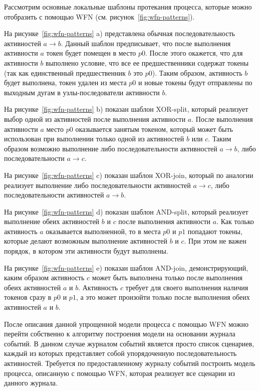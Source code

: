 \documentclass[
11pt,%
tightenlines,%
twoside,%
onecolumn,%
nofloats,%
nobibnotes,%
nofootinbib,%
superscriptaddress,%
noshowpacs,%
centertags]%
{revtex4}
\begin{document}
Рассмотрим основные локальные шаблоны протекания процесса, которые можно отобразить с помощью WFN (см. рисунок~\ref{fig:wfn-patterns}).

На рисунке~\ref{fig:wfn-patterns} a) представлена обычная последовательность активностей $a \rightarrow b$.
Данный шаблон предписывает, что после выполнения активности $a$ токен будет помещен в место $p0$.
После этого окажется, что для активности $b$ выполнено условие, что все ее предшественники содержат токены (так как единственный предшественник $b$ это $p0$).
Таким образом, активность $b$ будет выполнена, токен удален из места $p0$ и новые токены будут отправлены по выходным дугам в узлы-последователи активности $b$.
     
На рисунке~\ref{fig:wfn-patterns} b) показан шаблон XOR-split, который реализует выбор одной из активностей после выполнения активности $a$.
После выполнения активности $a$ место $p0$ оказывается занятым токеном, который может быть использован при выполнении только одной из активностей $b$ или $c$.
Таким образом возможно выполнение либо последовательности активностей $a \rightarrow b$, либо последовательности $a \rightarrow c$.

На рисунке~\ref{fig:wfn-patterns} c) показан шаблон XOR-join, который по аналогии реализует выполнение либо последовательности активностей $a \rightarrow c$, либо последовательности активностей $a \rightarrow b$.

На рисунке~\ref{fig:wfn-patterns} d) показан шаблон AND-split, который реализует выполнение обеих активностей $b$ и $c$ после выполнения активности $a$.
Как только активность $a$ оказывается выполненной, то в места $p0$ и $p1$ попадают токены, которые делают возможным выполнение активностей $b$ и $c$.
При этом не важен порядок, в котором эти активности будут выполнены.

На рисунке~\ref{fig:wfn-patterns} e) показан шаблон AND-join, демонстрирующий, каким образом активность $c$ может быть выполнена только после выполнения обеих активностей $a$ и $b$.
Активность $c$ требует для своего выполнения наличия токенов сразу в $p0$ и $p1$, а это может произойти только после выполнения обеих активностей $a$ и $b$.

После описания данной упрощенной модели процесса с помощью WFN можно перейти собственно к алгоритму построения модели на основании журнала событий.
В данном случае журналом событий является просто список сценариев, каждый из которых представляет собой упорядоченную последовательность активностей.
Требуется по предоставленному журналу событий построить модель процесса, описанную с помощью WFN, которая реализует все сценарии из данного журнала.
\end{document}

